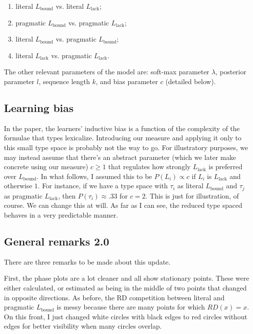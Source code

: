 \documentclass[fleqn,reqno,10pt]{article}
\newcommand{\mylang}[1]{\ensuremath{L_{\text{#1}}}\xspace} %
\newcommand{\Lbound}{\mylang{bound}}
\newcommand{\Llack}{\mylang{lack}}
\begin{document}
\begin{enumerate}
  \item literal $\Lbound$ vs. literal $\Llack$;
  \item pragmatic $\Lbound$ vs. pragmatic $\Llack$;
  \item literal $\Lbound$ vs. pragmatic $\Lbound$;
  \item literal $\Llack$ vs. pragmatic $\Llack$.
\end{enumerate}

The other relevant parameters of the model are: soft-max parameter $\lambda$, posterior parameter $l$, sequence length $k$, and bias parameter $c$ (detailed below).

\subsection*{Learning bias}
In the paper, the learners' inductive bias is a function of the complexity of the formulae that types lexicalize. Introducing our measure and applying it only to this small type space is probably not the way to go. For illustratory purposes, we may instead assume that there's an abstract parameter (which we later make concrete using our measure) $c \geq 1$ that regulates how strongly $\Llack$ is preferred over $\Lbound$. In what follows, I assumed this to be $P(L_i) \propto c$ if $L_i$ is $\Llack$ and otherwise $1$. For instance, if we have  a type space with $\tau_i$ as literal $\Lbound$ and $\tau_j$ as pragmatic $\Llack$, then $P(\tau_i) \approx .33$ for $c = 2$. This is just for illustration, of course. We can change this at will. As far as I can see, the reduced type spaced behaves in a very predictable manner.%

\subsection*{General remarks 2.0}
There are three remarks to be made about this update.

First, the phase plots are a lot cleaner and all show stationary points. These were either calculated, or estimated as being in the middle of two points that changed in opposite directions. As before, the RD competition between literal and pragmatic $\Lbound$ is messy because there are many points for which $RD(x) = x$. On this front, I just changed white circles with black edges to red circles without edges for better visibility when many circles overlap.  
\end{document}
